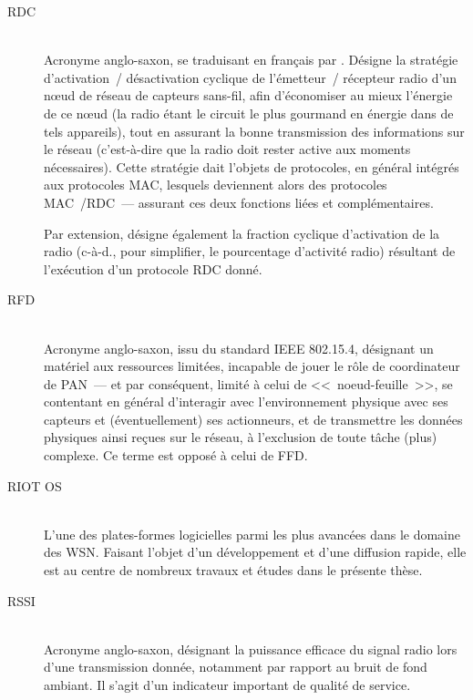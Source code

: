 \begin{description}

\item[RDC]  \\
Acronyme anglo-saxon, se traduisant en français par . Désigne la stratégie d'activation~/
désactivation cyclique de l'émetteur~/ récepteur radio d'un n{\oe}ud de
réseau de capteurs sans-fil, afin d'économiser au mieux l'énergie de
ce n{\oe}ud (la radio étant le circuit le plus gourmand en énergie dans
de tels appareils), tout en assurant la bonne transmission des informations
sur le réseau (c'est-à-dire que la radio doit rester active aux moments
nécessaires). Cette stratégie dait l'objets de protocoles, en général
intégrés aux protocoles MAC, lesquels deviennent alors des protocoles
MAC~/RDC~--- assurant ces deux fonctions liées et complémentaires.

Par extension,  désigne également la fraction
cyclique d'activation de la radio (c-à-d., pour simplifier, le pourcentage
d'activité radio) résultant de l'exécution d'un protocole RDC donné.

\item[RFD]  \\
Acronyme anglo-saxon, issu du standard IEEE 802.15.4, désignant un matériel
aux ressources limitées, incapable de jouer le rôle de coordinateur de
PAN~--- et par conséquent, limité à celui de <<~noeud-feuille~>>, se
contentant en général d'interagir avec l'environnement physique avec
ses capteurs et (éventuellement) ses actionneurs, et de transmettre
les données physiques ainsi reçues sur le réseau, à l'exclusion de
toute tâche (plus) complexe. Ce terme est opposé à celui de FFD.

\item[RIOT OS] \ \\
L'une des plates-formes logicielles parmi les plus avancées dans le domaine
des WSN. Faisant l'objet d'un développement et d'une diffusion rapide, elle
est au centre de nombreux travaux et études dans le présente thèse.

\item[RSSI]  \\
Acronyme anglo-saxon, désignant la puissance efficace du signal radio lors
d'une transmission donnée, notamment par rapport au bruit de fond ambiant.
Il s'agit d'un indicateur important de qualité de service.

\end{description}

